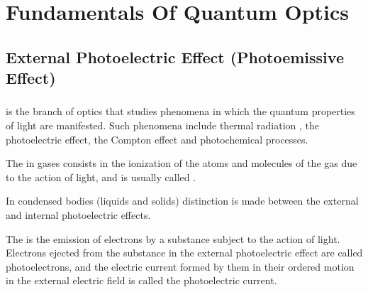 



\chapter{Fundamentals Of Quantum Optics}
\label{ch-37}

\section[External Photoelectric Effect]{External Photoelectric Effect
(Photoemissive Effect)}
\label{sec-37.1} 

\subsection{}\label{37.1.1}  is the branch of optics that studies phenomena in which the quantum properties of light are manifested. Such phenomena include thermal radiation , the photoelectric effect, the Compton effect  and photochemical processes.

The  in gases consists in the ionization of the atoms and molecules of the gas due to the action of light, and is usually called .

In condensed bodies (liquids and solids) distinction is made
between the external and internal photoelectric effects.

The  is the emission of electrons by a substance subject to the action of light. Electrons ejected from the substance in the external photoelectric effect are called photoelectrons, and the electric current formed by them in their ordered motion in the external electric field is called the photoelectric current.

